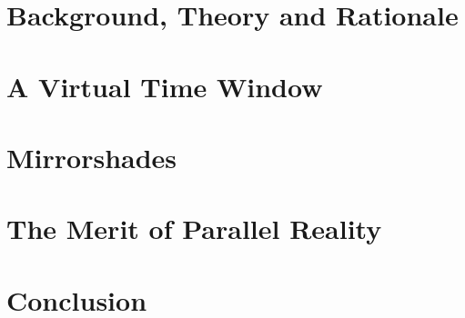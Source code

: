 \documentclass[a4paper]{report}
\begin{document}

%


\chapter{Background, Theory and Rationale}
\graphicspath{ {03_background/images/} }

%


\chapter{A Virtual Time Window}
\graphicspath{ {04_vtw/images/} }



\chapter{Mirrorshades}
\graphicspath{ {05_mirrorshades_design_implementation/images/} }



\chapter{The Merit of Parallel Reality}
\graphicspath{ {06_mirrorshades_studies_results/images/} }



\chapter{Conclusion}
\graphicspath{ {06_mirrorshades_studies_results/images/} }

\end{document}
